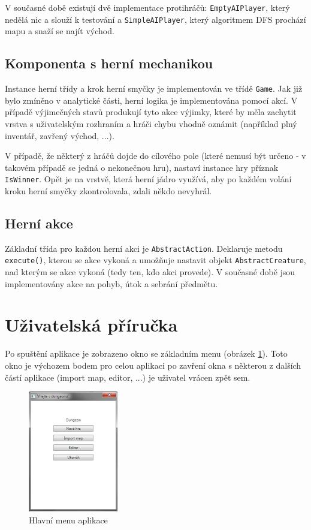 \documentclass[11pt,a4paper]{scrartcl}
\begin{document}
	V současné době existují dvě implementace protihráčů: \verb|EmptyAIPlayer|, který nedělá nic a slouží k testování a \verb|SimpleAIPlayer|, který algoritmem DFS prochází mapu a snaží se najít východ. 
	
	\subsection{Komponenta s herní mechanikou}
	Instance herní třídy a krok herní smyčky je implementován ve třídě \verb|Game|. Jak již bylo zmíněno v analytické části, herní logika je implementována pomocí akcí. V případě výjimečných stavů produkují tyto akce výjimky, které by měla zachytit vrstva s uživatelským rozhraním a hráči chybu vhodně oznámit (například plný inventář, zavřený východ, ...).
	
	V případě, že některý z hráčů dojde do cílového pole (které nemusí být určeno - v takovém případě se jedná o nekonečnou hru), nastaví instance hry příznak \verb|IsWinner|. Opět je na vrstvě, která herní jádro využívá, aby po každém volání kroku herní smyčky zkontrolovala, zdali někdo nevyhrál.
	
	\subsection{Herní akce}
	Základní třída pro každou herní akci je \verb|AbstractAction|. Deklaruje metodu \verb|execute()|, kterou se akce vykoná a umožňuje nastavit objekt \verb|AbstractCreature|, nad kterým se akce vykoná (tedy ten, kdo akci provede). V současné době jsou implementovány akce na pohyb, útok a sebrání předmětu.
	
	\section{Uživatelská příručka}
	Po spuštění aplikace je zobrazeno okno se základním menu (obrázek \ref{fig:main-window}). Toto okno je výchozem bodem pro celou aplikaci po zavření okna s některou z dalších částí aplikace (import map, editor, ...) je uživatel vrácen zpět sem.
	
	\begin{figure}[H]
		\centering
		\includegraphics[height=200px]{menu-window}
		\caption{Hlavní menu aplikace}
		\label{fig:main-window}
	\end{figure}
	
\end{document}
